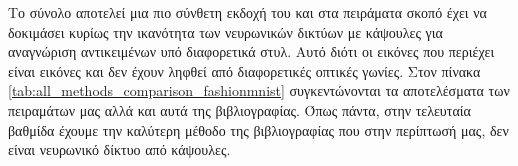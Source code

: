 Το σύνολο  αποτελεί μια πιο σύνθετη εκδοχή του  και στα πειράματα σκοπό έχει να δοκιμάσει κυρίως την ικανότητα των νευρωνικών δικτύων με κάψουλες για αναγνώριση αντικειμένων υπό διαφορετικά στυλ. Αυτό διότι οι εικόνες που περιέχει είναι εικόνες  και δεν έχουν ληφθεί από διαφορετικές οπτικές γωνίες. Στον πίνακα \ref{tab:all_methods_comparison_fashionmnist} συγκεντώνονται τα αποτελέσματα των πειραμάτων μας αλλά και αυτά της βιβλιογραφίας. Όπως πάντα, στην τελευταία βαθμίδα έχουμε την καλύτερη μέθοδο της βιβλιογραφίας που στην περίπτωσή μας, δεν είναι νευρωνικό δίκτυο από κάψουλες.
\begin{table}[h]
    \begin{center}
\end{center}
\end{table}
